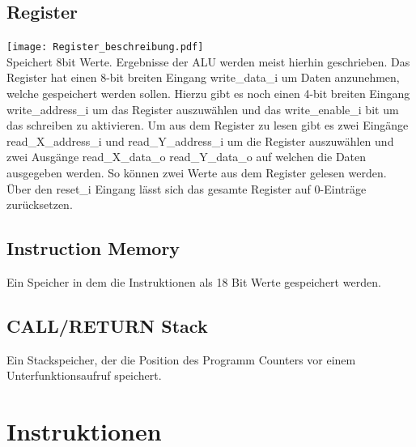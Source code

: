 \documentclass{scrartcl}
\begin{document}
\subsection{Register}
\texttt{[image: Register\_beschreibung.pdf]}\\
Speichert 8bit Werte. Ergebnisse der ALU werden meist hierhin geschrieben. Das Register hat einen 8-bit breiten Eingang write\_data\_i um Daten anzunehmen, welche gespeichert werden sollen. Hierzu gibt es noch einen 4-bit breiten Eingang write\_address\_i um das Register auszuwählen und das write\_enable\_i bit um das schreiben zu aktivieren. Um aus dem Register zu lesen gibt es zwei Eingänge read\_X\_address\_i und read\_Y\_address\_i um die Register auszuwählen und zwei Ausgänge read\_X\_data\_o read\_Y\_data\_o auf welchen die Daten ausgegeben werden. So können zwei Werte aus dem Register gelesen werden. Über den reset\_i Eingang lässt sich das gesamte Register auf 0-Einträge zurücksetzen.
\subsection{Instruction Memory}
Ein Speicher in dem die Instruktionen als 18 Bit Werte gespeichert werden.
\subsection{CALL/RETURN Stack}
Ein Stackspeicher, der die Position des Programm Counters vor einem Unterfunktionsaufruf speichert.


\section{Instruktionen}
\end{document}
